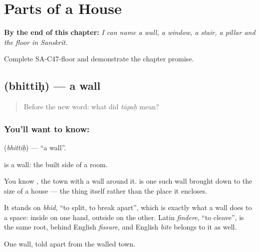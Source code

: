 
\chapter{Parts of a House}
\label{ch:sa-parts-of-a-house}

\begin{chapteropening}
\textbf{By the end of this chapter:} \emph{I can name a wall, a window, a stair, a pillar and the floor in Sanskrit.}

Complete SA-C47-floor and demonstrate the chapter promise.
\end{chapteropening}

\section[\texorpdfstring{\sk{भित्तिः} (bhittiḥ)}{भित्तिः (bhittiḥ)}]{ (bhittiḥ) — a wall}

\label{lesson:SA-C47-wall}



\begin{quote}
Before the new word: what did \emph{tāpaḥ} mean?
\end{quote}

\subsection*{You'll want to know: }
\textbf{} (\emph{bhittiḥ}) — \textquotedblleft{}a wall\textquotedblright{}.

\textbf{} is a wall: the built side of a room.

You know , the town with a wall around it. \textbf{} is one such wall brought down to the size of a house — the thing itself rather than the place it encloses.

It stands on \emph{bhid}, \textquotedblleft{}to split, to break apart\textquotedblright{}, which is exactly what a wall does to a space: inside on one hand, outside on the other. Latin \emph{findere}, \textquotedblleft{}to cleave\textquotedblright{}, is the same root, behind English \emph{fissure}, and English \emph{bite} belongs to it as well.

\begin{grammarlens}[title={What you've built}]
One wall, told apart from the walled town.
\end{grammarlens}

